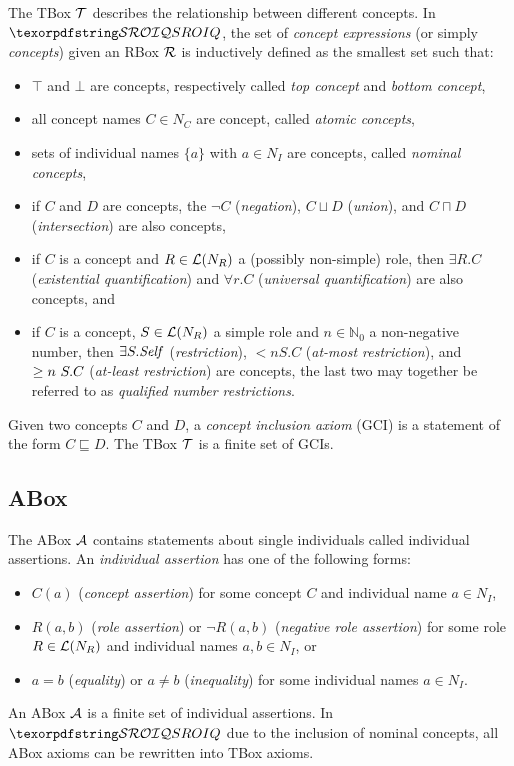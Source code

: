 The TBox $\mathcal{T}$ describes the relationship between different concepts. In $\SROIQ$, the set of \emph{concept expressions} (or simply \emph{concepts}) given an RBox $\mathcal{R}$ is inductively defined as the smallest set such that:
\begin{itemize}
  \item $\top$ and $\bot$ are concepts, respectively called \emph{top concept} and \emph{bottom concept},
  \item all concept names $C \in N_C$ are concept, called \emph{atomic concepts},
  \item sets of individual names $\{ a \}$ with $a \in N_I$ are concepts, called \emph{nominal concepts},
  \item if $C$ and $D$ are concepts, the $\lnot C$ (\emph{negation}), $C \sqcup D$ (\emph{union}), and $C \sqcap D$ (\emph{intersection}) are also concepts,
  \item if $C$ is a concept and $R \in \mathcal{L}(N_R)$ a (possibly non-simple) role, then $\exists R.C$ (\emph{existential quantification}) and $\forall r.C$ (\emph{universal quantification}) are also concepts, and
  \item if $C$ is a concept, $S \in \mathcal{L}(N_R)$ a simple role and $n \in \mathbb{N}_0$ a non-negative number, then $\exists S.\mathit{Self}$ (\emph{\self restriction}), $\less n S.C$ (\emph{at-most restriction}), and $\geq n~S.C$ (\emph{at-least restriction}) are concepts, the last two may together be referred to as \emph{qualified number restrictions}.
\end{itemize}
Given two concepts $C$ and $D$, a \emph{concept inclusion axiom} (GCI) is a statement of the form $C \sqsubseteq D$. The TBox $\mathcal{T}$ is a finite set of GCIs.

\subsection{ABox} \label{abox}

The ABox $\mathcal{A}$ contains statements about single individuals called individual assertions. An \emph{individual assertion} has one of the following forms:
\begin{itemize}
  \item $C(a)$ (\emph{concept assertion}) for some concept $C$ and individual name $a \in N_I$,
  \item $R(a, b)$ (\emph{role assertion}) or $\lnot R(a, b)$ (\emph{negative role assertion}) for some role $R \in \mathcal{L}(N_R)$ and individual names $a, b \in N_I$, or
  \item $a = b$ (\emph{equality}) or $a \not = b$ (\emph{inequality}) for some individual names $a \in N_I$.
\end{itemize}
An ABox $\mathcal{A}$ is a finite set of individual assertions. In $\SROIQ$ due to the inclusion of nominal concepts, all ABox axioms can be rewritten into TBox axioms.
